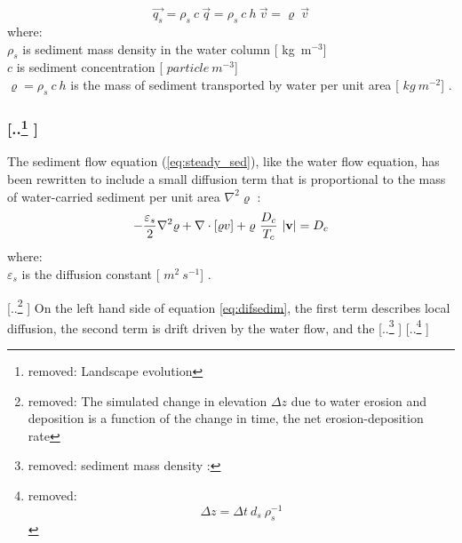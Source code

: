 \documentclass[gmd, manuscript]{copernicus}
\providecommand{\DIFadd}[1]{{\protect\color{blue} \sf #1}} %
\providecommand{\DIFdel}[1]{{\protect\color{red} [..\footnote{removed: #1} ]}} %
\providecommand{\DIFaddbegin}{} %
\providecommand{\DIFaddend}{} %
\providecommand{\DIFdelbegin}{} %
\providecommand{\DIFdelend}{} %
\begin{document}
\DIFdelend %
\DIFaddbegin \begin{equation}
\label{eq:sedflow}
\vec{q_s} = \rho_s~c~\vec{q} = \rho_s~c~h~\vec{v} = \varrho~\vec{v}
\end{equation}
{\DIFadd{\small
\noindent
where: }\\
\DIFadd{\hspace*{0.5em} $\rho_s$ is sediment mass density in the water column }[\DIFadd{\unit{kg~m}$^{-3}$}]\\
\DIFadd{\hspace*{0.5em} $c$ is sediment concentration }[\DIFadd{$\unit{particle~m^{-3}}$}]\\
\DIFadd{\hspace*{0.5em} $\varrho = \rho_s~c~h$ is the mass of sediment transported by water per unit area }[\DIFadd{$\unit{kg~m^{-2}}$}]\DIFadd{. 
}}
\DIFaddend 

\DIFdelbegin \subsubsection{\DIFdel{Landscape evolution}}
\addtocounter{subsubsection}{-1}%
\DIFdelend \DIFaddbegin \DIFadd{The sediment flow equation (\ref{eq:steady_sed}),
like the water flow equation, 
has been rewritten to include a small diffusion term that is
proportional to the mass of water-carried sediment per unit area 
$\nabla^2 \varrho$ \citep{Mitas1998}:
}\begin{equation}
\label{eq:difsedim}
-{\varepsilon_s \over 2}\nabla^2 \varrho
+ \nabla\cdot [\varrho \vec{v}]
 + \varrho~{D_c \over T_c}~|{\bf v}|
= D_c
\end{equation}
{\DIFadd{\small
\noindent
where:}\\
\DIFadd{\noindent
\hspace*{0.5em} $\varepsilon_s$ is the diffusion constant }[\DIFadd{$\unit{m^2~s^{-1}}$}]\DIFadd{.}\\
}
\DIFaddend 

\DIFdelbegin \DIFdel{The simulated change in elevation $\Delta z$
due to water erosion and deposition
is a function of the change in time, 
the net erosion-deposition rate}\DIFdelend \DIFaddbegin \DIFadd{On the left hand side of equation \ref{eq:difsedim}, 
the first term describes local diffusion, 
the second term is drift driven by the water flow}\DIFaddend ,
and the \DIFdelbegin \DIFdel{sediment mass density 
\citep{Mitasova2013}:
}
\DIFdel{
\begin{displaymath}
{\Delta z = \Delta t ~ d_s ~ \rho_s^{-1} }
\end{displaymath}}
\end{document}
